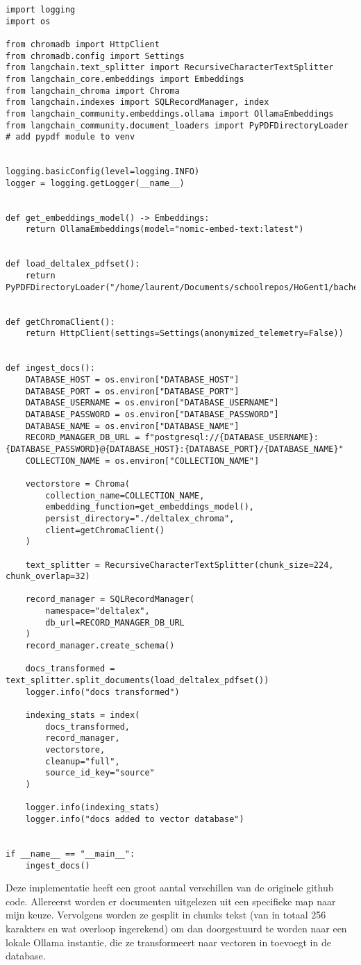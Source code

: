 \begin{lstlisting}
import logging
import os

from chromadb import HttpClient
from chromadb.config import Settings
from langchain.text_splitter import RecursiveCharacterTextSplitter
from langchain_core.embeddings import Embeddings
from langchain_chroma import Chroma
from langchain.indexes import SQLRecordManager, index
from langchain_community.embeddings.ollama import OllamaEmbeddings
from langchain_community.document_loaders import PyPDFDirectoryLoader
# add pypdf module to venv


logging.basicConfig(level=logging.INFO)
logger = logging.getLogger(__name__)


def get_embeddings_model() -> Embeddings:
    return OllamaEmbeddings(model="nomic-embed-text:latest")


def load_deltalex_pdfset():
    return PyPDFDirectoryLoader("/home/laurent/Documents/schoolrepos/HoGent1/bachelorsAssignment/deltalexDocs/").load()


def getChromaClient():
    return HttpClient(settings=Settings(anonymized_telemetry=False))


def ingest_docs():
    DATABASE_HOST = os.environ["DATABASE_HOST"]
    DATABASE_PORT = os.environ["DATABASE_PORT"]
    DATABASE_USERNAME = os.environ["DATABASE_USERNAME"]
    DATABASE_PASSWORD = os.environ["DATABASE_PASSWORD"]
    DATABASE_NAME = os.environ["DATABASE_NAME"]
    RECORD_MANAGER_DB_URL = f"postgresql://{DATABASE_USERNAME}:{DATABASE_PASSWORD}@{DATABASE_HOST}:{DATABASE_PORT}/{DATABASE_NAME}"
    COLLECTION_NAME = os.environ["COLLECTION_NAME"]

    vectorstore = Chroma(
        collection_name=COLLECTION_NAME,
        embedding_function=get_embeddings_model(),
        persist_directory="./deltalex_chroma",
        client=getChromaClient()
    )

    text_splitter = RecursiveCharacterTextSplitter(chunk_size=224, chunk_overlap=32)

    record_manager = SQLRecordManager(
        namespace="deltalex",
        db_url=RECORD_MANAGER_DB_URL
    )
    record_manager.create_schema()

    docs_transformed = text_splitter.split_documents(load_deltalex_pdfset())
    logger.info("docs transformed")

    indexing_stats = index(
        docs_transformed,
        record_manager,
        vectorstore,
        cleanup="full",
        source_id_key="source"
    )

    logger.info(indexing_stats)
    logger.info("docs added to vector database")


if __name__ == "__main__":
    ingest_docs()

\end{lstlisting}
Deze implementatie heeft een groot aantal verschillen van de originele github code. Allereerst worden er documenten uitgelezen uit een specifieke map naar mijn keuze.
Vervolgens worden ze gesplit in chunks tekst (van in totaal 256 karakters en wat overloop ingerekend) om dan doorgestuurd te worden naar een lokale Ollama instantie,
die ze transformeert naar vectoren in toevoegt in de database. \\

